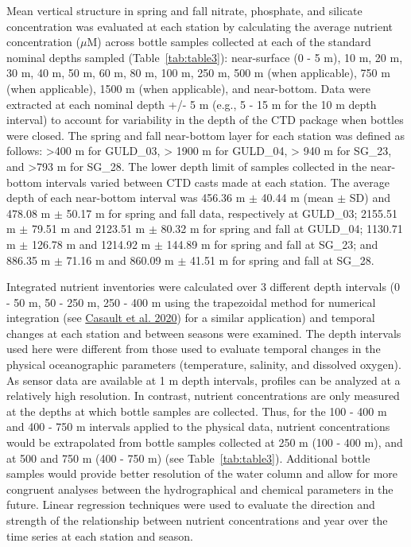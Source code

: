 \documentclass[12pt]{article}\usepackage[]{graphicx}\usepackage[]{color}
\begin{document}
Mean vertical structure in spring and fall nitrate, phosphate, and silicate concentration was evaluated at each station by calculating the average nutrient concentration (\(\mu\)M) across bottle samples collected at each of the standard nominal depths sampled (Table~\ref{tab:table3}): near-surface (0 - 5 m), 10 m, 20 m, 30 m, 40 m, 50 m, 60 m, 80 m, 100 m, 250 m, 500 m (when applicable), 750 m (when applicable), 1500 m (when applicable), and near-bottom. Data were extracted at each nominal depth +/- 5 m (e.g., 5 - 15 m for the 10 m depth interval) to account for variability in the depth of the CTD package when bottles were closed. The spring and fall near-bottom layer for each station was defined as follows: \textgreater400 m for GULD\_03, \textgreater{} 1900 m for GULD\_04, \textgreater{} 940 m for SG\_23, and \textgreater793 m for SG\_28. The lower depth limit of samples collected in the near-bottom intervals varied between CTD casts made at each station. The average depth of each near-bottom interval was 456.36 m \(\pm\) 40.44 m (mean \(\pm\) SD) and 478.08 m \(\pm\) 50.17 m for spring and fall data, respectively at GULD\_03; 2155.51 m \(\pm\) 79.51 m and 2123.51 m \(\pm\) 80.32 m for spring and fall at GULD\_04; 1130.71 m \(\pm\) 126.78 m and 1214.92 m \(\pm\) 144.89 m for spring and fall at SG\_23; and 886.35 m \(\pm\) 71.16 m and 860.09 m \(\pm\) 41.51 m for spring and fall at SG\_28.

Integrated nutrient inventories were calculated over 3 different depth intervals (0 - 50 m, 50 - 250 m, 250 - 400 m using the trapezoidal method for numerical integration (see \protect\hyperlink{ref-casault_2020}{Casault et al. 2020}) for a similar application) and temporal changes at each station and between seasons were examined. The depth intervals used here were different from those used to evaluate temporal changes in the physical oceanographic parameters (temperature, salinity, and dissolved oxygen). As sensor data are available at 1 m depth intervals, profiles can be analyzed at a relatively high resolution. In contrast, nutrient concentrations are only measured at the depths at which bottle samples are collected. Thus, for the 100 - 400 m and 400 - 750 m intervals applied to the physical data, nutrient concentrations would be extrapolated from bottle samples collected at 250 m (100 - 400 m), and at 500 and 750 m (400 - 750 m) (see Table~\ref{tab:table3}). Additional bottle samples would provide better resolution of the water column and allow for more congruent analyses between the hydrographical and chemical parameters in the future. Linear regression techniques were used to evaluate the direction and strength of the relationship between nutrient concentrations and year over the time series at each station and season.
\end{document}
